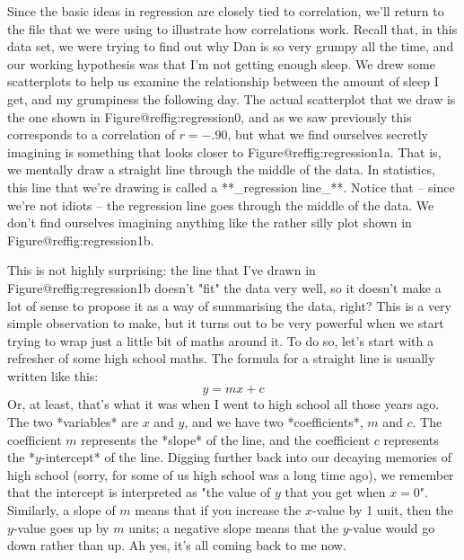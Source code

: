 Since the basic ideas in regression are closely tied to correlation, we'll return to the  file that we were using to illustrate how correlations work. Recall that, in this data set, we were trying to find out why Dan is so very grumpy all the time, and our working hypothesis was that I'm not getting enough sleep. We drew some scatterplots to help us examine the relationship between the amount of sleep I get, and my grumpiness the following day. The actual scatterplot that we draw is the one shown in Figure@reffig:regression0, and as we saw previously this corresponds to a correlation of $r=-.90$, but what we find ourselves secretly imagining is something that looks closer to Figure@reffig:regression1a. That is, we mentally draw a straight line through the middle of the data. In statistics, this line that we're drawing is called a **_regression line_**. Notice that -- since we're not idiots -- the regression line goes through the middle of the data. We don't find ourselves imagining anything like the rather silly plot shown in Figure@reffig:regression1b. 

This is not highly surprising: the line that I've drawn in Figure@reffig:regression1b doesn't "fit" the data very well, so it doesn't make a lot of sense to propose it as a way of summarising the data, right? This is a very simple observation to make, but it turns out to be very powerful when we start trying to wrap just a little bit of maths around it. To do so, let's start with a refresher of some high school maths. The formula for a straight line is usually written like this:
$$
y = mx + c
$$ 
Or, at least, that's what it was when I went to high school all those years ago. The two *variables* are $x$ and $y$, and we have two *coefficients*, $m$ and $c$. The coefficient $m$ represents the *slope* of the line, and the coefficient $c$ represents the *$y$-intercept* of the line. Digging further back into our decaying memories of high school (sorry, for some of us high school was a long time ago), we remember that the intercept is interpreted as "the value of $y$ that you get when $x=0$". Similarly, a slope of $m$ means that if you increase the $x$-value by 1 unit, then the $y$-value goes up by $m$ units; a negative slope means that the $y$-value would go down rather than up. Ah yes, it's all coming back to me now. 

